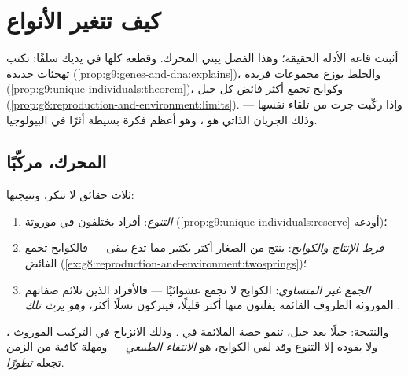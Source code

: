 \chapter{كيف تتغير الأنواع}\label{ch:g9:how-species-change}

أثبتت قاعة الأدلة الحقيقة؛ وهذا الفصل يبني المحرك. وقطعه
كلها في يديك سلفًا:  تكتب تهجئات جديدة
(\cref{prop:g9:genes-and-dna:explains})، والخلط يوزع
مجموعات فريدة
(\cref{prop:g9:unique-individuals:theorem})، وكوابح
 تجمع أكثر فائض كل جيل
(\cref{prop:g8:reproduction-and-environment:limits}).
وإذا ركّبت جرت من تلقاء نفسها --- وذلك الجريان الذاتي هو
، وهو أعظم فكرة بسيطة أثرًا في
البيولوجيا.

\section{المحرك، مركّبًا}

\begin{proposition}\label{prop:g9:how-species-change:selection}
ثلاث حقائق لا تنكر، ونتيجتها:
\begin{enumerate}
  \item \emph{التنوع}: أفراد  يختلفون في 
        موروثة
        (\cref{prop:g9:unique-individuals:reserve}
        أودعه)؛
  \item \emph{فرط الإنتاج والكوابح}: ينتج من الصغار أكثر
        بكثير مما تدع  يبقى --- فالكوابح تجمع
        الفائض
        (\cref{ex:g8:reproduction-and-environment:twosprings})؛
  \item \emph{الجمع غير المتساوي}: الكوابح لا تجمع
        عشوائيًا --- فالأفراد الذين تلائم صفاتهم الموروثة
        الظروف القائمة يفلتون منها أكثر قليلًا، فيتركون
        نسلًا أكثر، \emph{وهو يرث تلك }.
\end{enumerate}
والنتيجة: جيلًا بعد جيل، تنمو حصة  الملائمة في
. وذلك الانزياح في التركيب الموروث ، ولا
يقوده إلا التنوع وقد لقي الكوابح، هو \emph{الانتقاء
الطبيعي} --- ومهلة كافية من الزمن
تجعله \emph{تطورًا}.
\end{proposition}
\admitted

